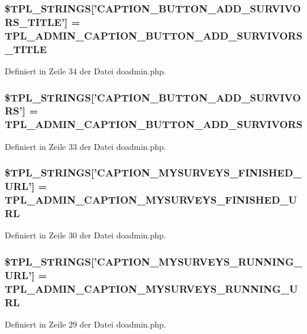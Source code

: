 \subsubsection{\setlength{\rightskip}{0pt plus 5cm}\$TPL\_\-STRINGS['CAPTION\_\-BUTTON\_\-ADD\_\-SURVIVORS\_\-TITLE'] = {\bf TPL\_\-ADMIN\_\-CAPTION\_\-BUTTON\_\-ADD\_\-SURVIVORS\_\-TITLE}}\label{doadmin_8php_665f7e1830592fd2a51af6f61d386db2}




Definiert in Zeile 34 der Datei doadmin.php.
\subsubsection{\setlength{\rightskip}{0pt plus 5cm}\$TPL\_\-STRINGS['CAPTION\_\-BUTTON\_\-ADD\_\-SURVIVORS'] = {\bf TPL\_\-ADMIN\_\-CAPTION\_\-BUTTON\_\-ADD\_\-SURVIVORS}}\label{doadmin_8php_d6119d6d7a684161a04ad236c3f2c9b4}




Definiert in Zeile 33 der Datei doadmin.php.
\subsubsection{\setlength{\rightskip}{0pt plus 5cm}\$TPL\_\-STRINGS['CAPTION\_\-MYSURVEYS\_\-FINISHED\_\-URL'] = {\bf TPL\_\-ADMIN\_\-CAPTION\_\-MYSURVEYS\_\-FINISHED\_\-URL}}\label{doadmin_8php_8a584c62935c7d9770244598b07c2147}




Definiert in Zeile 30 der Datei doadmin.php.
\subsubsection{\setlength{\rightskip}{0pt plus 5cm}\$TPL\_\-STRINGS['CAPTION\_\-MYSURVEYS\_\-RUNNING\_\-URL'] = {\bf TPL\_\-ADMIN\_\-CAPTION\_\-MYSURVEYS\_\-RUNNING\_\-URL}}\label{doadmin_8php_41b657c6e3910d90783d12e2fc1568eb}




Definiert in Zeile 29 der Datei doadmin.php.
